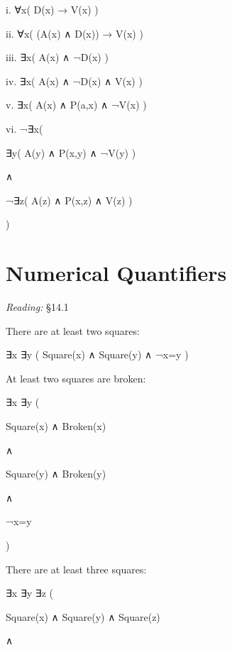 \documentclass[12pt]{extarticle}
\begin{document}
\begin{multicols*}{3}
\begin{minipage}{\columnwidth}
\end{minipage}
 
i. ∀x( D(x) → V(x) )
 
ii. ∀x( (A(x) ∧ D(x)) → V(x) )
 
iii. ∃x( A(x) ∧ ¬D(x) )
 
iv. ∃x( A(x) ∧ ¬D(x) ∧ V(x) )
 
v. ∃x( A(x) ∧ P(a,x) ∧ ¬V(x) )
 
vi. ¬∃x(
 
\hspace{5mm} ∃y( A(y) ∧ P(x,y) ∧ ¬V(y) )
 
\hspace{5mm} ∧
 
\hspace{5mm} ¬∃z( A(z) ∧ P(x,z) ∧ V(z) )
 
)
 
 
 
\section{Numerical Quantifiers}
 
\emph{Reading:} §14.1
 
There are at least two squares:
 
\hspace{5mm} ∃x ∃y ( Square(x) ∧ Square(y) ∧ ¬x=y )
 
At least two squares are broken:
 
\hspace{5mm} ∃x ∃y (
 
\hspace{10mm} Square(x) ∧ Broken(x)
 
\hspace{10mm} ∧
 
\hspace{10mm} Square(y) ∧ Broken(y)
 
\hspace{10mm} ∧
 
\hspace{10mm} ¬x=y
 
\hspace{5mm} )
 
There are at least three squares:
 
\hspace{5mm} ∃x ∃y ∃z (
 
\hspace{10mm} Square(x) ∧ Square(y) ∧ Square(z)
 
\hspace{10mm} ∧
 

\end{multicols*}
\end{document}
